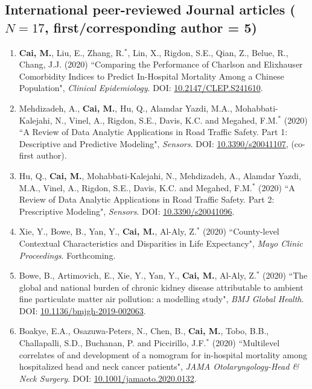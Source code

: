 \documentclass[11pt, a4paper]{article}
\newcommand{\years}[1]{\marginnote{\scriptsize #1}}
\begin{document}
	\subsection*{International peer-reviewed Journal articles ($N=17$, first/corresponding author = 5)}
	\begin{enumerate}[leftmargin=0ex,itemsep=1ex]
		\item \years{2020}\textbf{Cai, M.}, Liu, E., Zhang, R.$^\ast$, Lin, X., Rigdon, S.E., Qian, Z., Belue, R., Chang, J.J. (2020) ``Comparing the Performance of Charlson and Elixhauser Comorbidity Indices to Predict In-Hospital Mortality Among a Chinese Population", \emph{Clinical Epidemiology}. DOI: \href{https://doi.org/10.2147/CLEP.S241610}{10.2147/CLEP.S241610}.
		
		\item Mehdizadeh, A., \textbf{Cai, M.}, Hu, Q., Alamdar Yazdi, M.A., Mohabbati-Kalejahi, N., Vinel, A., Rigdon, S.E., Davis, K.C. and Megahed, F.M.$^\ast$ (2020) ``A Review of Data Analytic Applications in Road Traffic Safety. Part 1: Descriptive and Predictive Modeling", \emph{Sensors}. DOI: \href{https://doi.org/10.3390/s20041107}{10.3390/s20041107}, (co-first author).
		
		\item Hu, Q., \textbf{Cai, M.}, Mohabbati-Kalejahi, N., Mehdizadeh, A., Alamdar Yazdi, M.A., Vinel, A., Rigdon, S.E., Davis, K.C. and Megahed, F.M.$^\ast$ (2020) ``A Review of Data Analytic Applications in Road Traffic Safety. Part 2: Prescriptive Modeling", \emph{Sensors}. DOI: \href{https://doi.org/10.3390/s20041096}{10.3390/s20041096}.
		
		\item Xie, Y., Bowe, B., Yan, Y., \textbf{Cai, M.}, Al-Aly, Z.$^\ast$ (2020) ``County-level Contextual Characteristics and Disparities in Life Expectancy", \emph{Mayo Clinic Proceedings}. Forthcoming.
		
		\item Bowe, B., Artimovich, E., Xie, Y., Yan, Y., \textbf{Cai, M.}, Al-Aly, Z.$^\ast$ (2020) ``The global and national burden of chronic kidney disease attributable to ambient fine particulate matter air pollution: a modelling study", \emph{BMJ Global Health}. DOI: \href{https://doi.org/10.1136/bmjgh-2019-002063}{10.1136/bmjgh-2019-002063}.
		
		\item Boakye, E.A., Osazuwa-Peters, N., Chen, B., \textbf{Cai, M.}, Tobo, B.B., Challapalli, S.D., Buchanan, P. and Piccirillo, J.F.$^\ast$ (2020) ``Multilevel correlates of and development of a nomogram for in-hospital mortality among hospitalized head and neck cancer patients", \emph{JAMA Otolaryngology-Head \& Neck Surgery}. DOI: \href{https://doi.org/10.1001/jamaoto.2020.0132}{10.1001/jamaoto.2020.0132}.


\end{enumerate}
\end{document}
